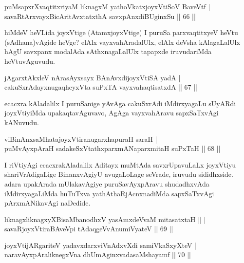 \begin{shl}
puMsapxrXvaqtitxriyaM liknagxM yathoVkatxjoyxVtiSoV BaveVtf | \\
savaRtArxvayxBicAritAvxtatxthA savxpAnxdiBUginxSu \hfill ||  66 ||  
\end{shl}

\begin{artha}
hiMdeV heVLida joyxVtige (AtamxjoyxVtige) I puruSa parxvaqtitxyeV heVtu (sAdhana)vAgide heVge? elAlx vayxvahAradalUlx, elAlx deVsha kAlagaLalUlx hAgU savxpanx modalAda sAthxnagaLalUlx tapapxde iruvudariMda heVtuvAguvudu.
\end{artha}


\begin{shl}
jAgarxtAkxleV nArasAyxsayx BAnAvxdijoyxVtiSA yadA | \\
cakuSxrAdayxnugaqheyxVta suPxTA vayxvahaqtisatxdA \hfill||  67 ||  
\end{shl}

\begin{artha}
ecacxra kAladalilx I puruSanige yAvAga cakuSxrAdi iMdirxyagaLu sUyARdi joyxVtiyiMda upakaqtavAguvavo, AgAga vayxvahAravu sapxSaTxvAgi kANuvudu.
\end{artha}

\begin{shl}
viBinAnxsaMhatajoyxVtiranugarxhapuraH saraH | \\
puMvAyxpAraH sadakeSxVtathxparxmANaparxmitaH suPxTaH \hfill||  68 ||  
\end{shl}

\begin{artha}
I riVtiyAgi ecacxrakAladalilx Aditayx muMtAda savxrUpavuLaLx joyxVtiyu shariVrAdigaLige BinanxvAgiyU avugaLoLage seVrade, iruvudu sididhxside. adara upakArada mUlakavAgiye puruSavAyxpAravu shudadhxvAda iMdirxyagaLiMda huTuTxva yathAthaRjAcnxnadiMda sapxSaTxvAgi pArxmANikavAgi naDedide.
\end{artha}


\begin{shl}
liknagxliknagxyXBisaMbanodhxV yasAmxdeVvaM mitasatxtaH ||  | \\
savaRjoyxVtiraBAveV\s pi tAdaqgeVvAnumiVyateV \hfill||  69 || 
\end{shl}

\begin{shl}
joyxVtijARgariteV yadavxdarxviVnAdxvXdi samiVkaSxyXteV | \\
naravAyxpAraliknegxVna dhUmAginxvadasaMshayamf \hfill||  70 ||  
\end{shl}

